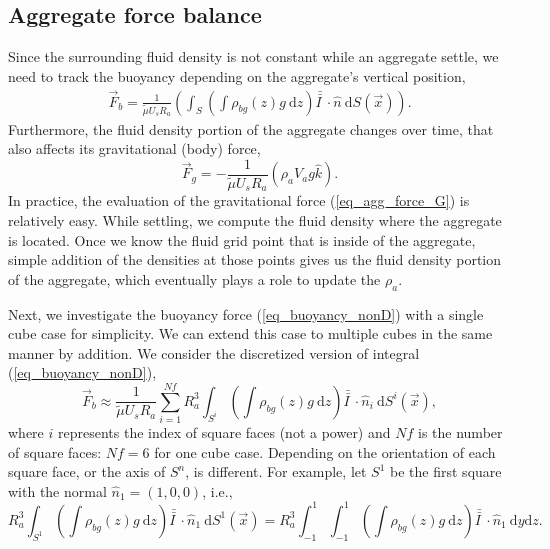  \subsection{Aggregate force balance}
Since the surrounding fluid density is not constant while an aggregate settle, we need to track the buoyancy depending on the aggregate's vertical position,
\begin{align}
	\vec{F}_{b}
	 = \frac{1}{\tilde{\mu} U_s R_a} 
	 \left(
	  \int_{S} \left( 
	  \int \rho_{bg}(z) g \ \textrm{d}z 
	  \right) \bar{\bar{I \ }}  \cdot
	 \hat{n} \ \textrm{d}S (\vec{x})
   \right).
   \label{eq_buoyancy_nonD}
\end{align}
Furthermore, the fluid density portion of the aggregate changes over time, that also affects its gravitational (body) force,
\begin{equation}
	\vec{F}_g = 
	- \frac{1}{\tilde{\mu} U_s R_a} 
	\left( \rho_a V_a g \hat{k}	 \right).
	\label{eq_agg_force_G}
\end{equation}
In practice, the evaluation of the gravitational force (\ref{eq_agg_force_G}) is relatively easy. While settling, we compute the fluid density where the aggregate is located. Once we know the fluid grid point that is inside of the aggregate, simple addition of the densities at those points gives us the fluid density portion of the aggregate, which eventually plays a role to update the $\rho_a$. 
\par
Next, we investigate the buoyancy force (\ref{eq_buoyancy_nonD}) with a single cube case for simplicity. 
We can extend this case to multiple cubes in the same manner by addition. We consider the discretized version of integral (\ref{eq_buoyancy_nonD}), 
\begin{equation}
	\vec{F}_b \approx
	\frac{1}{\tilde{\mu} U_s R_a} 
	\sum_{i=1}^{Nf}
	 R_a^3 \int_{S^i} \left( 
	   \int  {\rho_{bg}} (z) g  \ \textrm{d}z 
	 \right) \bar{\bar{I \ }}  \cdot
	\hat{n}_i \ \textrm{d}S^i (\vec{x}),
\label{eq_buoyancy_discrete2}
\end{equation}
where $i$ represents the index of square faces (not a power) and $Nf$ is the number of square faces: $Nf = 6$ for one cube case. Depending on the orientation of each square face, or the axis of $S^n$, is different. For example, let $S^1$ be the first square with the normal $\hat{n}_1 = (1,0,0)$, i.e., 
\begin{equation}
	R_a^3 
	 \int_{S^1}
	 \left( 
	   \int  {\rho_{bg}} (z) g \ \textrm{d}z 
	 \right) \bar{\bar{I \ }}  \cdot
	\hat{n}_1 \ \textrm{d}S^1 (\vec{x})
	= R_a^3  \int_{-1}^{1} \int_{-1}^{1}
	\left( 
  	 \int  {\rho_{bg}} (z) g \ \textrm{d}z 
 	\right) \bar{\bar{I \ }}  \cdot
 	\hat{n}_1 \ 
	\textrm{d}y  \textrm{d}z.
\label{eq_buoyancy_S1_2}
\end{equation}
